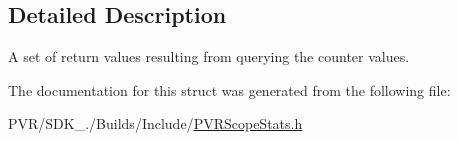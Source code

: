 \subsection{Detailed Description}
A set of return values resulting from querying the counter values. 



 

The documentation for this struct was generated from the following file\+:\begin{DoxyCompactItemize}
\item 
P\+V\+R/\+S\+D\+K\+\_./\+Builds/\+Include/\hyperlink{_p_v_r_scope_stats_8h}{P\+V\+R\+Scope\+Stats.\+h}\end{DoxyCompactItemize}
